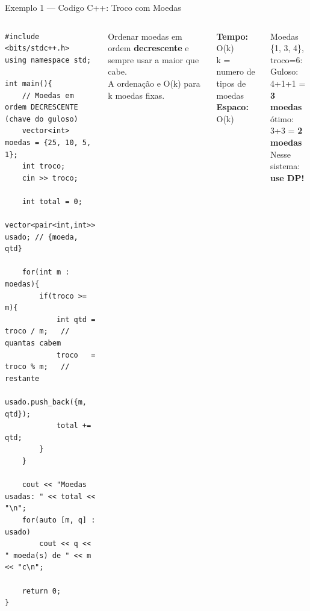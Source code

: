 \documentclass[aspectratio=169,10pt]{beamer}
\begin{document}
\begin{frame}[fragile,shrink=3]{Exemplo 1 --- Codigo C++: Troco com Moedas}
  \begin{columns}[t]
      \begin{tcolorbox}[caixaCodigo]
        \begin{lstlisting}[style=cppstyle]
#include <bits/stdc++.h>
using namespace std;

int main(){
    // Moedas em ordem DECRESCENTE (chave do guloso)
    vector<int> moedas = {25, 10, 5, 1};
    int troco;
    cin >> troco;

    int total = 0;
    vector<pair<int,int>> usado; // {moeda, qtd}

    for(int m : moedas){
        if(troco >= m){
            int qtd = troco / m;   // quantas cabem
            troco   = troco % m;   // restante
            usado.push_back({m, qtd});
            total += qtd;
        }
    }

    cout << "Moedas usadas: " << total << "\n";
    for(auto [m, q] : usado)
        cout << q << " moeda(s) de " << m << "c\n";

    return 0;
}
        \end{lstlisting}
      \end{tcolorbox}
      \begin{tcolorbox}[caixaDourada,title={Chave do Guloso}]
        \footnotesize
        Ordenar moedas em ordem
        \textbf{decrescente} e sempre
        usar a maior que cabe.\\[4pt]
        A ordenação e O(k) para
        k moedas fixas.
      \end{tcolorbox}
      \vspace{0.1cm}
      \begin{tcolorbox}[caixaAzul,title={Complexidade}]
        \footnotesize
        \textbf{Tempo:} O(k)\\
        k = numero de tipos de moedas\\[3pt]
        \textbf{Espaco:} O(k)
      \end{tcolorbox}
      \vspace{0.1cm}
      \begin{tcolorbox}[caixaVermelho,title={Contraexemplo!}]
        \footnotesize
        Moedas \{1, 3, 4\}, troco=6:\\[2pt]
        Guloso: 4+1+1 = \textbf{3 moedas}\\
        ótimo:  3+3 = \textbf{2 moedas}\\[2pt]
        Nesse sistema: \textbf{use DP!}
      \end{tcolorbox}
  \end{columns}
\end{frame}
\end{document}
